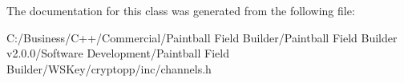 The documentation for this class was generated from the following file:\begin{DoxyCompactItemize}
\item 
C:/Business/C++/Commercial/Paintball Field Builder/Paintball Field Builder v2.0.0/Software Development/Paintball Field Builder/WSKey/cryptopp/inc/channels.h\end{DoxyCompactItemize}
